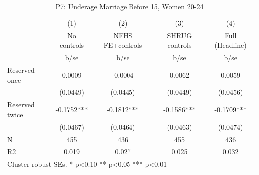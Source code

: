 \begin{table}[htbp]\centering
\def\sym#1{\ifmmode^{#1}\else\(^{#1}\)\fi}
\caption{P7: Underage Marriage Before 15, Women 20-24}
\begin{tabular}{l*{4}{c}}
\toprule
            &\multicolumn{1}{c}{(1)}   &\multicolumn{1}{c}{(2)}   &\multicolumn{1}{c}{(3)}   &\multicolumn{1}{c}{(4)}   \\
            & No controls   &NFHS FE+controls   &SHRUG controls   &Full (Headline)   \\
            &        b/se   &        b/se   &        b/se   &        b/se   \\
\midrule
Reserved once&      0.0009   &     -0.0004   &      0.0062   &      0.0059   \\
            &    (0.0449)   &    (0.0445)   &    (0.0449)   &    (0.0456)   \\
Reserved twice&     -0.1752***&     -0.1812***&     -0.1586***&     -0.1709***\\
            &    (0.0467)   &    (0.0464)   &    (0.0463)   &    (0.0474)   \\
\midrule
N           &         455   &         436   &         455   &         436   \\
R2          &       0.019   &       0.027   &       0.025   &       0.032   \\
\bottomrule
\multicolumn{5}{l}{\footnotesize Cluster-robust SEs. * p<0.10 ** p<0.05 *** p<0.01}\\
\end{tabular}
\end{table}
